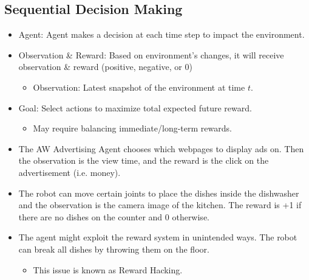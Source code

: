 \subsection{Sequential Decision Making}
\begin{definition}
    \begin{itemize}
        \item Agent: Agent makes a decision at each time step to impact the environment. 
        \item Observation \& Reward: Based on environment's changes, it will receive observation \& reward (positive, negative, or 0)
            \begin{itemize}
                \item Observation: Latest snapshot of the environment at time $t$.
            \end{itemize}
        \item Goal: Select actions to maximize total expected future reward.
            \begin{itemize}
                \item May require balancing immediate/long-term rewards.
            \end{itemize}
    \end{itemize}
\end{definition}

\begin{example}
    \begin{itemize}
        \item The AW Advertising Agent chooses which webpages to display ads on. Then the observation is the view time, and the reward is the click on the advertisement (i.e. money).
    \end{itemize}
    \begin{itemize}
        \item The robot can move certain joints to place the dishes inside the dishwasher and the observation is the camera image of the kitchen. The reward is +1 if there are no dishes on the counter and 0 otherwise. 
        \item The agent might exploit the reward system in unintended ways. The robot can break all dishes by throwing them on the floor. 
        \begin{itemize}
            \item This issue is known as Reward Hacking.
        \end{itemize}
    \end{itemize}
\end{example}


